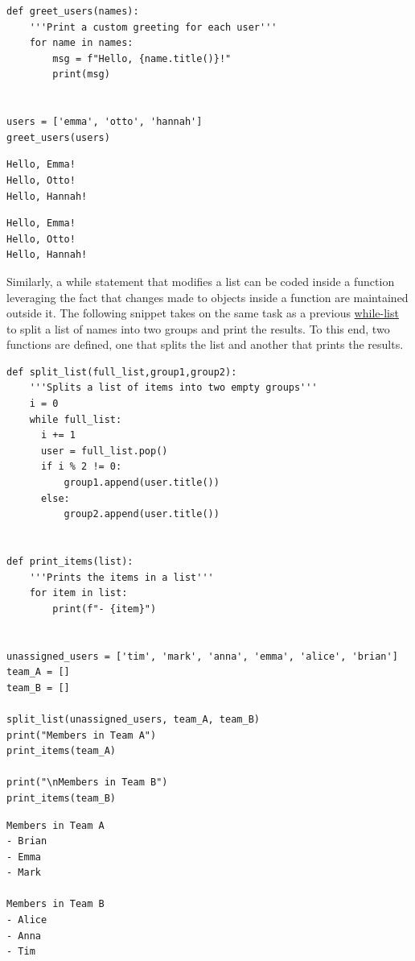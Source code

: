 \documentclass[10pt]{book}
\begin{document}
\label{org4ddea11}
\begin{verbatim}
def greet_users(names):
    '''Print a custom greeting for each user'''
    for name in names:
        msg = f"Hello, {name.title()}!"
        print(msg)


users = ['emma', 'otto', 'hannah']
greet_users(users)
\end{verbatim}

\label{orgfee9cde}
\begin{verbatim}
Hello, Emma!
Hello, Otto!
Hello, Hannah!
\end{verbatim}

\label{orgbc01e17}
\begin{verbatim}
Hello, Emma!
Hello, Otto!
Hello, Hannah!
\end{verbatim}

Similarly, a while statement that modifies a list can be coded inside a function leveraging the fact that changes made to objects inside a function are maintained outside it. The following  snippet takes on the same task as a previous  \hyperref[orgf970f23]{while-list} to split a list of names into two groups and print the results. To this end, two functions are defined, one that splits the list and another that prints the results.

\label{orgd916b9a}
\begin{verbatim}
def split_list(full_list,group1,group2):
    '''Splits a list of items into two empty groups'''
    i = 0
    while full_list:
      i += 1
      user = full_list.pop()
      if i % 2 != 0:
          group1.append(user.title())
      else:
          group2.append(user.title())  


def print_items(list):
    '''Prints the items in a list'''
    for item in list:
        print(f"- {item}")


unassigned_users = ['tim', 'mark', 'anna', 'emma', 'alice', 'brian']
team_A = []
team_B = []

split_list(unassigned_users, team_A, team_B)
print("Members in Team A")
print_items(team_A)

print("\nMembers in Team B")
print_items(team_B)
\end{verbatim}

\label{orgc71cbc5}
\begin{verbatim}
Members in Team A
- Brian
- Emma
- Mark

Members in Team B
- Alice
- Anna
- Tim
\end{verbatim}
\end{document}
